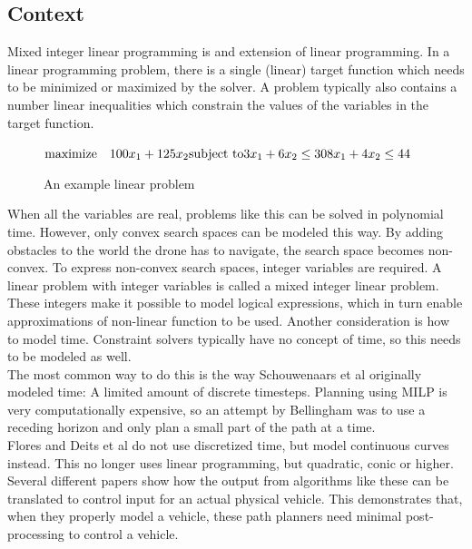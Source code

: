 \documentclass[12pt]{article}
\begin{document}
\subsection{Context}
\label{subsec:previous}
Mixed integer linear programming is and extension of linear programming. In a linear programming problem, there is a single (linear) target function which needs to be minimized or maximized by the solver. A problem typically also contains a number linear inequalities which constrain the values of the variables in the target function.
\begin{figure}[h]
\begin{math}
\text{maximize} \quad 100 x_1 + 125 x_2 \\
\text{subject to} \\
3 x_1 + 6 x_2 \leq 30 \\
8 x_1 + 4 x_2 \leq 44
\end{math}
\caption{An example linear problem}
\end{figure}
When all the variables are real, problems like this can be solved in polynomial time. However, only convex search spaces can be modeled this way. By adding obstacles to the world the drone has to navigate, the search space becomes non-convex. To express non-convex search spaces, integer variables are required\cite{Schouwenaars2001}. A linear problem with integer variables is called a mixed integer linear problem. These integers make it possible to model logical expressions, which in turn enable approximations of non-linear function to be used. Another consideration is how to model time. Constraint solvers typically have no concept of time, so this needs to be modeled as well. \\
The most common way to do this is the way Schouwenaars et al\cite{Schouwenaars2001} originally modeled time: A limited amount of discrete timesteps. Planning using MILP is very computationally expensive, so an attempt by Bellingham\cite{Bellingham2002} was to use a receding horizon and only plan a small part of the path at a time. \\ 
Flores\cite{Flores2007} and Deits et al\cite{Deits2015} do not use discretized time, but model continuous curves instead. This no longer uses linear programming, but quadratic, conic or higher.
\\
Several different papers\cite{Fliess1995a, Hao2005, Cowling2007, Mellinger2011} show how the output from algorithms like these can be translated to control input for an actual physical vehicle. This demonstrates that, when they properly model a vehicle, these path planners need minimal post-processing to control a vehicle.
\end{document}
